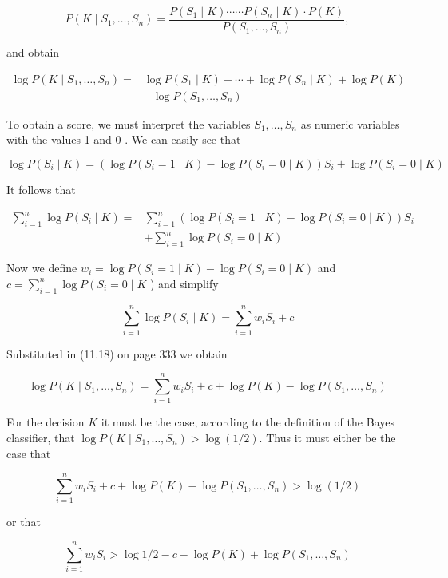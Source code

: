 \documentclass[10pt]{article}
\begin{document}
$$
P\left(K \mid S_{1}, \ldots, S_{n}\right)=\frac{P\left(S_{1} \mid K\right) \cdots \cdots P\left(S_{n} \mid K\right) \cdot P(K)}{P\left(S_{1}, \ldots, S_{n}\right)},
$$

and obtain


\begin{align*}
\log P\left(K \mid S_{1}, \ldots, S_{n}\right)= & \log P\left(S_{1} \mid K\right)+\cdots+\log P\left(S_{n} \mid K\right)+\log P(K) \\
& -\log P\left(S_{1}, \ldots, S_{n}\right) \tag{11.18}
\end{align*}


To obtain a score, we must interpret the variables $S_{1}, \ldots, S_{n}$ as numeric variables with the values 1 and 0 . We can easily see that

$$
\log P\left(S_{i} \mid K\right)=\left(\log P\left(S_{i}=1 \mid K\right)-\log P\left(S_{i}=0 \mid K\right)\right) S_{i}+\log P\left(S_{i}=0 \mid K\right)
$$

It follows that

$$
\begin{aligned}
\sum_{i=1}^{n} \log P\left(S_{i} \mid K\right)= & \sum_{i=1}^{n}\left(\log P\left(S_{i}=1 \mid K\right)-\log P\left(S_{i}=0 \mid K\right)\right) S_{i} \\
& +\sum_{i=1}^{n} \log P\left(S_{i}=0 \mid K\right)
\end{aligned}
$$

Now we define $w_{i}=\log P\left(S_{i}=1 \mid K\right)-\log P\left(S_{i}=0 \mid K\right)$ and $c=\sum_{i=1}^{n} \log P\left(S_{i}=\right. 0 \mid K$ ) and simplify

$$
\sum_{i=1}^{n} \log P\left(S_{i} \mid K\right)=\sum_{i=1}^{n} w_{i} S_{i}+c
$$

Substituted in (11.18) on page 333 we obtain

$$
\log P\left(K \mid S_{1}, \ldots, S_{n}\right)=\sum_{i=1}^{n} w_{i} S_{i}+c+\log P(K)-\log P\left(S_{1}, \ldots, S_{n}\right)
$$

For the decision $K$ it must be the case, according to the definition of the Bayes classifier, that $\log P\left(K \mid S_{1}, \ldots, S_{n}\right)>\log (1 / 2)$. Thus it must either be the case that

$$
\sum_{i=1}^{n} w_{i} S_{i}+c+\log P(K)-\log P\left(S_{1}, \ldots, S_{n}\right)>\log (1 / 2)
$$

or that

$$
\sum_{i=1}^{n} w_{i} S_{i}>\log 1 / 2-c-\log P(K)+\log P\left(S_{1}, \ldots, S_{n}\right)
$$
\end{document}
